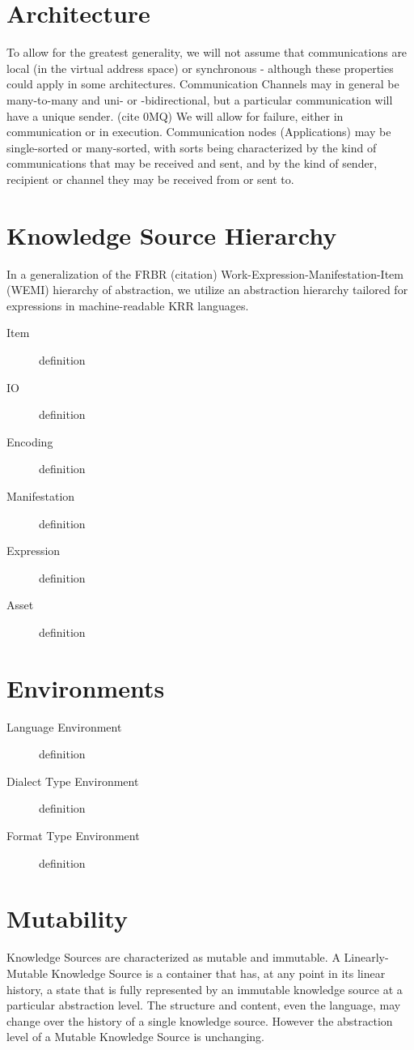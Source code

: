\documentclass[runningheads]{llncs}
\begin{document}
\section{Architecture}
To allow for the greatest generality, we will not assume that communications are local (in the virtual address space) or synchronous - although these properties could apply in some architectures. Communication Channels may in general be many-to-many and uni- or -bidirectional, but a particular communication will have a unique sender. (cite 0MQ) We will allow for failure, either in communication or in execution. Communication nodes (Applications) may be single-sorted or many-sorted, with sorts being characterized by the kind of communications that may be received and sent, and by the kind of sender, recipient or channel they may be received from or sent to.

\section{Knowledge Source Hierarchy}
In a generalization of the FRBR (citation) Work-Expression-Manifestation-Item (WEMI) hierarchy of abstraction, we utilize an abstraction hierarchy tailored for expressions in machine-readable KRR languages.
\begin{description}
\item[Item] definition
\item[IO] definition
\item[Encoding] definition
\item[Manifestation] definition
\item[Expression] definition
\item[Asset] definition
\end{description}

\section{Environments}
\begin{description}
\item[Language Environment] definition
\item[Dialect Type Environment] definition
\item[Format Type Environment] definition
\end{description}

\section{Mutability}
Knowledge Sources are characterized as mutable and immutable. A Linearly-Mutable Knowledge Source is a container that has, at any point in its linear history, a state that is fully represented by an immutable knowledge source at a particular abstraction level. The structure and content, even the language, may change over the history of a single knowledge source. However the abstraction level of a Mutable Knowledge Source is unchanging. 
\end{document}
